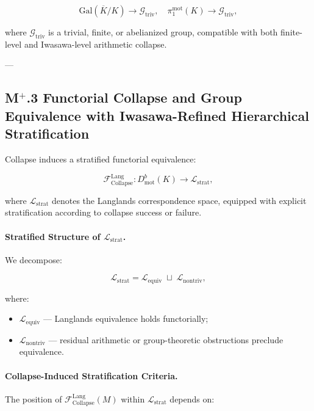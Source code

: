 \documentclass[11pt]{article}
\begin{document}
\[
\mathrm{Gal}(\overline{K}/K) \longrightarrow \mathcal{G}_{\mathrm{triv}}, \quad \pi_1^{\mathrm{mot}}(K) \longrightarrow \mathcal{G}_{\mathrm{triv}},
\]

where $\mathcal{G}_{\mathrm{triv}}$ is a trivial, finite, or abelianized group, compatible with both finite-level and Iwasawa-level arithmetic collapse.

---

\subsection*{M$^{+}$.3 Functorial Collapse and Group Equivalence with Iwasawa-Refined Hierarchical Stratification}

Collapse induces a stratified functorial equivalence:

\[
\mathcal{F}_{\mathrm{Collapse}}^{\mathrm{Lang}} : D^b_{\mathrm{mot}}(K) \longrightarrow \mathcal{L}_{\mathrm{strat}},
\]

where \( \mathcal{L}_{\mathrm{strat}} \) denotes the Langlands correspondence space, equipped with explicit stratification according to collapse success or failure.

\paragraph{Stratified Structure of \( \mathcal{L}_{\mathrm{strat}} \).}

We decompose:

\[
\mathcal{L}_{\mathrm{strat}} = \mathcal{L}_{\mathrm{equiv}} \;\sqcup\; \mathcal{L}_{\mathrm{nontriv}},
\]

where:

\begin{itemize}
    \item \( \mathcal{L}_{\mathrm{equiv}} \) — Langlands equivalence holds functorially;
    \item \( \mathcal{L}_{\mathrm{nontriv}} \) — residual arithmetic or group-theoretic obstructions preclude equivalence.
\end{itemize}

\paragraph{Collapse-Induced Stratification Criteria.}

The position of \( \mathcal{F}_{\mathrm{Collapse}}^{\mathrm{Lang}}(M) \) within \( \mathcal{L}_{\mathrm{strat}} \) depends on:
\end{document}
